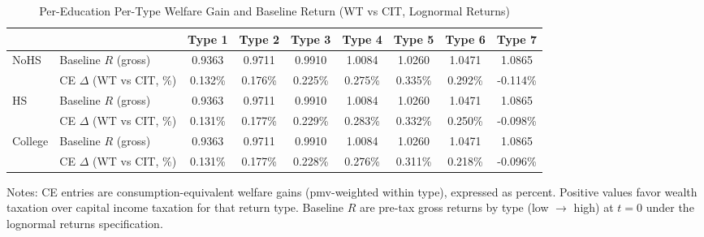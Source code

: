 \begin{table}[!htbp]
\centering
\caption{Per-Education Per-Type Welfare Gain and Baseline Return (WT vs CIT, Lognormal Returns)}
\label{tab:ce_per_type_wt_vs_cit_lc_lognorm}
\begin{threeparttable}
\begin{tabular}{llccccccc}
\toprule
\multicolumn{2}{c}{} & \textbf{Type 1} & \textbf{Type 2} & \textbf{Type 3} & \textbf{Type 4} & \textbf{Type 5} & \textbf{Type 6} & \textbf{Type 7} \\
\midrule
\multirow{2}{*}{NoHS}
  & Baseline $R$ (gross)        & 0.9363 & 0.9711 & 0.9910 & 1.0084 & 1.0260 & 1.0471 & 1.0865 \\
  & CE $\Delta$ (WT vs CIT, \%)  & 0.132\% & 0.176\% & 0.225\% & 0.275\% & 0.335\% & 0.292\% & -0.114\% \\
\midrule
\multirow{2}{*}{HS}
  & Baseline $R$ (gross)        & 0.9363 & 0.9711 & 0.9910 & 1.0084 & 1.0260 & 1.0471 & 1.0865 \\
  & CE $\Delta$ (WT vs CIT, \%)  & 0.131\% & 0.177\% & 0.229\% & 0.283\% & 0.332\% & 0.250\% & -0.098\% \\
\midrule
\multirow{2}{*}{College}
  & Baseline $R$ (gross)        & 0.9363 & 0.9711 & 0.9910 & 1.0084 & 1.0260 & 1.0471 & 1.0865 \\
  & CE $\Delta$ (WT vs CIT, \%)  & 0.131\% & 0.177\% & 0.228\% & 0.276\% & 0.311\% & 0.218\% & -0.096\% \\
\bottomrule
\end{tabular}
\begin{tablenotes}[flushleft]
\footnotesize
\item Notes: CE entries are consumption-equivalent welfare gains (pmv-weighted within type), expressed as percent. Positive values favor wealth taxation over capital income taxation for that return type. Baseline $R$ are pre-tax gross returns by type (low $\rightarrow$ high) at $t=0$ under the lognormal returns specification.
\end{tablenotes}
\end{threeparttable}
\end{table}
